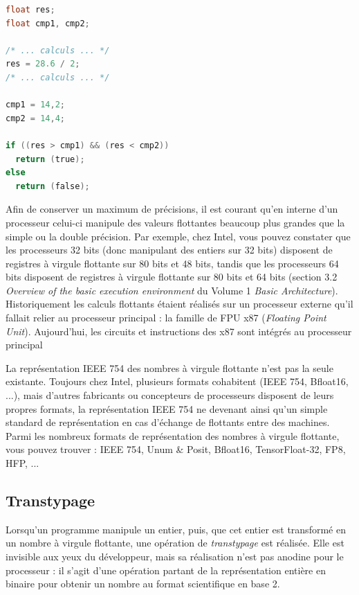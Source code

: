 \documentclass[11pt,a4paper]{article}
\begin{document}
\bigskip

\begin{lstlisting}[language=C]
float res;
float cmp1, cmp2;

/* ... calculs ... */
res = 28.6 / 2;
/* ... calculs ... */

cmp1 = 14,2;
cmp2 = 14,4;

if ((res > cmp1) && (res < cmp2))
  return (true);
else
  return (false);
\end{lstlisting}

\bigskip

Afin de conserver un maximum de précisions, il est courant qu'en interne d'un processeur celui-ci manipule des valeurs flottantes beaucoup plus grandes que la simple ou la double précision.
Par exemple, chez Intel, vous pouvez constater que les processeurs 32 bits (donc manipulant des entiers sur 32 bits) disposent de registres à virgule flottante sur 80 bits et 48 bits, tandis que les processeurs 64 bits disposent de registres à virgule flottante sur 80 bits et 64 bits (section 3.2 \textit{Overview of the basic execution environment} du Volume 1 \textit{Basic Architecture}).
Historiquement les calculs flottants étaient réalisés sur un processeur externe qu'il fallait relier au processeur principal : la famille de FPU x87 (\textit{Floating Point Unit}).
Aujourd'hui, les circuits et instructions des x87 sont intégrés au processeur principal

\medskip

La représentation IEEE 754 des nombres à virgule flottante n'est pas la seule existante.
Toujours chez Intel, plusieurs formats cohabitent (IEEE 754, Bfloat16, ...), mais d'autres fabricants ou concepteurs de processeurs disposent de leurs propres formats, la représentation IEEE 754 ne devenant ainsi qu'un simple standard de représentation en cas d'échange de flottants entre des machines.
Parmi les nombreux formats de représentation des nombres à virgule flottante, vous pouvez trouver : IEEE 754, Unum \& Posit, Bfloat16, TensorFloat-32, FP8, HFP, ...



\subsection{Transtypage}

Lorsqu'un programme manipule un entier, puis, que cet entier est transformé en un nombre à virgule flottante, une opération de \textit{transtypage} est réalisée.
Elle est invisible aux yeux du développeur, mais sa réalisation n'est pas anodine pour le processeur : il s'agit d'une opération partant de la représentation entière en binaire pour obtenir un nombre au format scientifique en base 2.
\end{document}
